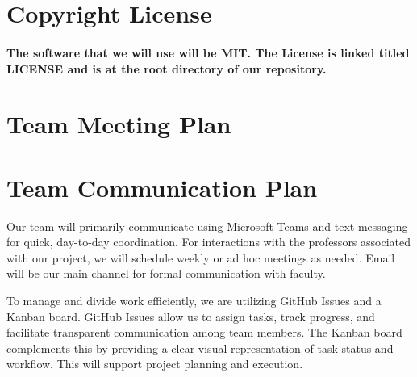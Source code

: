 \documentclass{article}
\begin{document}
\section{Copyright License}

\paragraph{The software that we will use will be MIT. The License is linked titled LICENSE and is at the root directory of our repository.}


\section{Team Meeting Plan}






\section{Team Communication Plan}

Our team will primarily communicate using Microsoft Teams and text messaging for quick, day-to-day coordination. For interactions with the professors associated with our project, we will schedule weekly or ad hoc meetings as needed. Email will be our main channel for formal communication with faculty.

To manage and divide work efficiently, we are utilizing GitHub Issues and a Kanban board. GitHub Issues allow us to assign tasks, track progress, and facilitate transparent communication among team members. The Kanban board complements this by providing a clear visual representation of task status and workflow. This will support project planning and execution.

\end{document}
